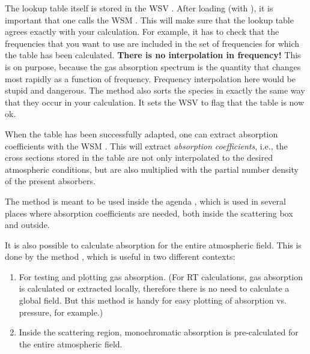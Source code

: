 
The lookup table itself is stored in the WSV
. After loading (with ),
it is important that one calls the WSM
. This will make sure that the lookup
table agrees exactly with your calculation. For example, it has to
check that the frequencies that you want to use are included in the
set of frequencies for which the table has been calculated.
\textbf{There is no interpolation in frequency!} This is on purpose,
because the gas absorption spectrum is the quantity that changes most
rapidly as a function of frequency. Frequency interpolation here would
be stupid and dangerous. The method also sorts the species in exactly
the same way that they occur in your calculation. It sets the WSV
 to flag that the table is now
ok.

When the table has been successfully adapted, one can extract
absorption coefficients with the WSM
. This will extract
\emph{absorption coefficients}, i.e., the cross sections stored in the
table are not only interpolated to the desired atmospheric conditions,
but are also multiplied with the partial number density of the present
absorbers. 

The  method is meant to
be used inside the agenda ,
which is used in several places where absorption coefficients are
needed, both inside the scattering box and outside. 

It is also possible to calculate absorption for the entire atmospheric
field.  This is done by the method
, which is useful in two
different contexts:

\begin{enumerate}
\item For testing and plotting gas absorption. (For RT
  calculations, gas absorption is calculated or extracted locally,
  therefore there is no need to calculate a global field. But this
  method is handy for easy plotting of absorption vs. pressure, for
  example.)
\item Inside the scattering region, monochromatic absorption is
  pre-calculated for the entire atmospheric field.
\end{enumerate}

